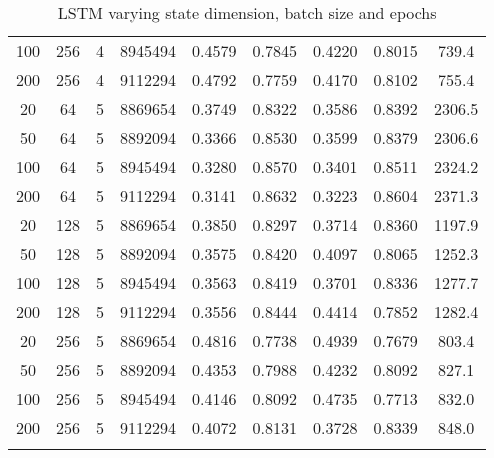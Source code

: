 \documentclass[letterpaper, 10pt]{article}
\begin{document}
\begin{longtable}{c | c | c | c | c | c | c | c | c}
100 & 256 & 4 & 8945494 & 0.4579 & 0.7845 & 0.4220 & 0.8015 & 739.4 \\
200 & 256 & 4 & 9112294 & 0.4792 & 0.7759 & 0.4170 & 0.8102 & 755.4 \\
\hline
20 & 64 & 5 & 8869654 & 0.3749 & 0.8322 & 0.3586 & 0.8392 & 2306.5 \\
50 & 64 & 5 & 8892094 & 0.3366 & 0.8530 & 0.3599 & 0.8379 & 2306.6 \\
100 & 64 & 5 & 8945494 & 0.3280 & 0.8570 & 0.3401 & 0.8511 & 2324.2 \\
200 & 64 & 5 & 9112294 & 0.3141 & 0.8632 & 0.3223 & 0.8604 & 2371.3 \\
20 & 128 & 5 & 8869654 & 0.3850 & 0.8297 & 0.3714 & 0.8360 & 1197.9 \\
50 & 128 & 5 & 8892094 & 0.3575 & 0.8420 & 0.4097 & 0.8065 & 1252.3 \\
100 & 128 & 5 & 8945494 & 0.3563 & 0.8419 & 0.3701 & 0.8336 & 1277.7 \\
200 & 128 & 5 & 9112294 & 0.3556 & 0.8444 & 0.4414 & 0.7852 & 1282.4 \\
20 & 256 & 5 & 8869654 & 0.4816 & 0.7738 & 0.4939 & 0.7679 & 803.4 \\
50 & 256 & 5 & 8892094 & 0.4353 & 0.7988 & 0.4232 & 0.8092 & 827.1 \\
100 & 256 & 5 & 8945494 & 0.4146 & 0.8092 & 0.4735 & 0.7713 & 832.0 \\
200 & 256 & 5 & 9112294 & 0.4072 & 0.8131 & 0.3728 & 0.8339 & 848.0 \\
\caption{LSTM varying state dimension, batch size and epochs}
\label{tab:fullresultslstm1}
\end{longtable}

\newpage


\end{document}

